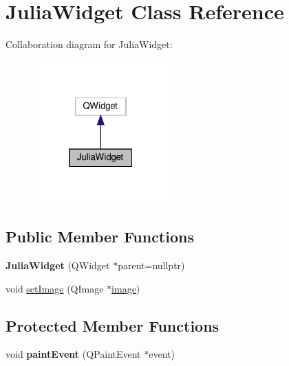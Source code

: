 \hypertarget{classJuliaWidget}{}\section{Julia\+Widget Class Reference}
\label{classJuliaWidget}


Collaboration diagram for Julia\+Widget\+:
\nopagebreak
\begin{figure}[H]
\begin{center}
\leavevmode
\includegraphics[width=148pt]{classJuliaWidget__coll__graph}
\end{center}
\end{figure}
\subsection*{Public Member Functions}
\begin{DoxyCompactItemize}
\item 
\mbox{\label{classJuliaWidget_a43281a37bd560567372d1f9ccfd673c5}} 
{\bfseries Julia\+Widget} (Q\+Widget $\ast$parent=nullptr)
\item 
void \hyperlink{classJuliaWidget_a686d58acadb8eaa396ca6904318a5547}{set\+Image} (Q\+Image $\ast$\hyperlink{classJuliaWidget_abc96ffcb51d90cc16ed92242fdb62d1b}{image})
\end{DoxyCompactItemize}
\subsection*{Protected Member Functions}
\begin{DoxyCompactItemize}
\item 
\mbox{\label{classJuliaWidget_a65d06d3f69873f573380fde577abfcf2}} 
void {\bfseries paint\+Event} (Q\+Paint\+Event $\ast$event)
\end{DoxyCompactItemize}
